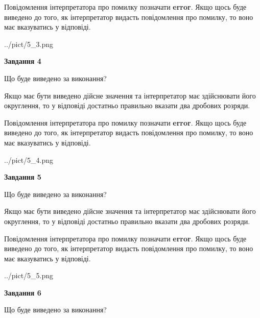 \documentclass[12pt, ukrainian]{article}
\begin{document}
{\begin {Large}
Повідомлення інтерпретатора про помилку позначати \textbf{error}.
Якщо щось буде виведено до того, як інтерпретатор видасть повідомлення про помилку, 
то воно має вказуватись у відповіді. \par

\begin{center}
	{../pict/5_3.png}
\end{center}
\newpage

{\begin {center}\textbf{Завдання 4}\end {center}}\par
Що буде виведено за виконання? \par

Якщо має бути виведено дійсне значення та інтерпретатор має здійснювати його округлення, 
то у відповіді достатньо правильно вказати два дробових розряди.

Повідомлення інтерпретатора про помилку позначати \textbf{error}.
Якщо щось буде виведено до того, як інтерпретатор видасть повідомлення про помилку, 
то воно має вказуватись у відповіді. \par

\begin{center}
	{../pict/5_4.png}
\end{center}
\newpage

{\begin {center}\textbf{Завдання 5}\end {center}}\par
Що буде виведено за виконання? \par

Якщо має бути виведено дійсне значення та інтерпретатор має здійснювати його округлення, 
то у відповіді достатньо правильно вказати два дробових розряди.

Повідомлення інтерпретатора про помилку позначати \textbf{error}.
Якщо щось буде виведено до того, як інтерпретатор видасть повідомлення про помилку, 
то воно має вказуватись у відповіді. \par

\begin{center}
	{../pict/5_5.png}
\end{center}
\newpage

{\begin {center}\textbf{Завдання 6}\end {center}}\par
Що буде виведено за виконання? \par


\end{Large}}
\end{document}
